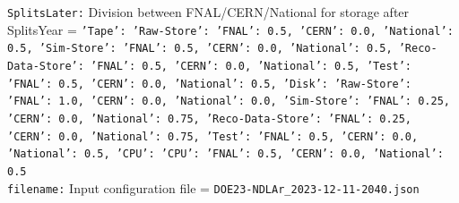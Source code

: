 {\tt SplitsLater:} Division between FNAL/CERN/National for storage after SplitsYear = {\tt {'Tape': {'Raw-Store': {'FNAL': 0.5, 'CERN': 0.0, 'National': 0.5}, 'Sim-Store': {'FNAL': 0.5, 'CERN': 0.0, 'National': 0.5}, 'Reco-Data-Store': {'FNAL': 0.5, 'CERN': 0.0, 'National': 0.5}, 'Test': {'FNAL': 0.5, 'CERN': 0.0, 'National': 0.5}}, 'Disk': {'Raw-Store': {'FNAL': 1.0, 'CERN': 0.0, 'National': 0.0}, 'Sim-Store': {'FNAL': 0.25, 'CERN': 0.0, 'National': 0.75}, 'Reco-Data-Store': {'FNAL': 0.25, 'CERN': 0.0, 'National': 0.75}, 'Test': {'FNAL': 0.5, 'CERN': 0.0, 'National': 0.5}}, 'CPU': {'CPU': {'FNAL': 0.5, 'CERN': 0.0, 'National': 0.5}}}} \\
{\tt filename:} Input configuration file = {\tt DOE23-NDLAr_2023-12-11-2040.json} \\
